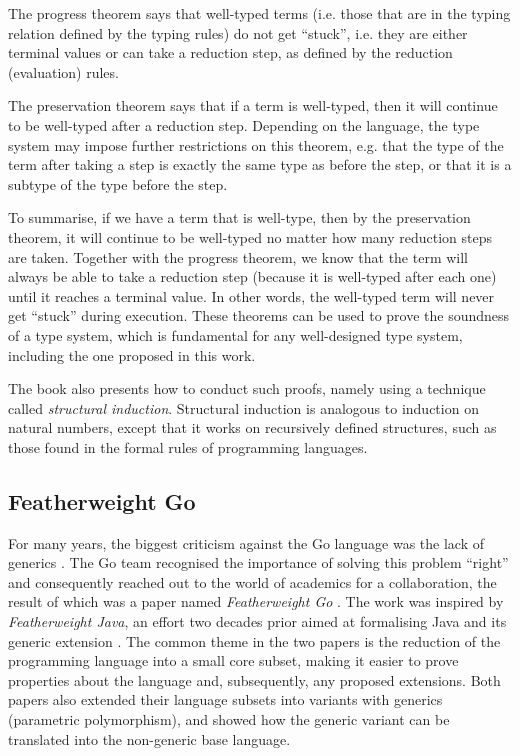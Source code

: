 The progress theorem says that well-typed terms (i.e. those that are in the
typing relation defined by the typing rules) do not get ``stuck'', i.e. they are
either terminal values or can take a reduction step, as defined by the reduction
(evaluation) rules.

The preservation theorem says that if a term is well-typed, then it will
continue to be well-typed after a reduction step. Depending on the language,
the type system may impose further restrictions on this theorem, e.g. that
the type of the term after taking a step is exactly the same type as before
the step, or that it is a subtype of the type before the step.

To summarise, if we have a term that is well-type, then by the preservation
theorem, it will continue to be well-typed no matter how many reduction steps
are taken. Together with the progress theorem, we know that the term will always
be able to take a reduction step (because it is well-typed after each one) until
it reaches a terminal value. In other words, the well-typed term will never get
``stuck'' during execution. These theorems can be used to prove the soundness of
a type system, which is fundamental for any well-designed type system, including
the one proposed in this work.

The book also presents how to conduct such proofs, namely using a technique
called \emph{structural induction}. Structural induction is analogous to
induction on natural numbers, except that it works on recursively defined
structures, such as those found in the formal rules of programming languages.

\subsection{Featherweight Go}

For many years, the biggest criticism against the Go language was the lack of
generics \autocites{survey2021}{survey2020}{survey2019}. The Go team recognised
the importance of solving this problem ``right'' and consequently reached out to
the world of academics for a collaboration, the result of which was a paper
named \emph{Featherweight Go} \autocite{fg}. The work was inspired by
\emph{Featherweight Java}, an effort two decades prior aimed at formalising Java
and its generic extension \autocite{fj}.
The common theme in the two papers is the reduction of the programming language
into a small core subset, making it easier to prove properties about the
language and, subsequently, any proposed extensions.
Both papers also extended their language subsets into variants with generics
(parametric polymorphism), and showed how the generic variant can be translated
into the non-generic base language.

